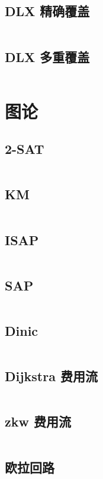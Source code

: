 \documentclass[titlepage,landscape,a4paper,10pt]{article}
\begin{document}
\begin{multicols}{2}
\begin{spacing}{0.8}
\subsection{DLX 精确覆盖}
\inputminted{cpp}{DataStructure/DLX.cpp}

\subsection{DLX 多重覆盖}
\inputminted{cpp}{DataStructure/DLX2.cpp}

\section{图论}

\subsection{2-SAT}
\inputminted{cpp}{Graph/2-SAT.cpp}

\subsection{KM}
\inputminted{cpp}{Graph/KM.cpp}

\subsection{ISAP}
\inputminted{cpp}{Graph/ISAP.cpp}

\subsection{SAP}
\inputminted{cpp}{Graph/SAP.cpp}

\subsection{Dinic}
\inputminted{cpp}{Graph/dinic.cpp}

\subsection{Dijkstra 费用流}
\inputminted{cpp}{Graph/MinCostFlow.cpp}

\subsection{zkw 费用流}
\inputminted{cpp}{Graph/zkw费用流.cpp}

\subsection{欧拉回路}
\inputminted{cpp}{Graph/欧拉回路.cpp}


\end{spacing}
\end{multicols}
\end{document}
